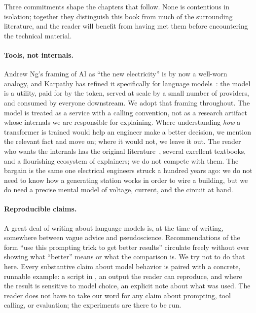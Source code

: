 Three commitments shape the chapters that follow. None is
contentious in isolation; together they distinguish this book from
much of the surrounding literature, and the reader will benefit
from having met them before encountering the technical material.

\paragraph{Tools, not internals.}
Andrew Ng's framing of AI as ``the new electricity'' is by now a
well-worn analogy, and Karpathy has refined it specifically for
language models~\citep{karpathy2025software}: the model is a
utility, paid for by the token, served at scale by a small number
of providers, and consumed by everyone downstream. We adopt that
framing throughout. The model is treated as a service with a
calling convention, not as a research artifact whose internals we
are responsible for explaining. Where understanding \emph{how} a
transformer is trained would help an engineer make a better
decision, we mention the relevant fact and move on; where it
would not, we leave it out. The reader who wants the internals
has the original
literature~\citep{vaswani2017attention}, several
excellent textbooks, and a flourishing ecosystem of explainers;
we do not compete with them. The bargain is the same one
electrical engineers struck a hundred years ago: we do not need
to know how a generating station works in order to wire a
building, but we do need a precise mental model of voltage,
current, and the circuit at hand.

\paragraph{Reproducible claims.}
A great deal of writing about language models is, at the time of
writing, somewhere between vague advice and pseudoscience.
Recommendations of the form ``use this prompting trick to get
better results'' circulate freely without ever showing what
``better'' means or what the comparison is. We try not to do that
here. Every substantive claim about model behavior is paired
with a concrete, runnable example: a script in
, an output the reader can reproduce,
and where the result is sensitive to model choice, an explicit
note about what was used. The reader does not have to take our
word for any claim about prompting, tool calling, or evaluation;
the experiments are there to be run.

